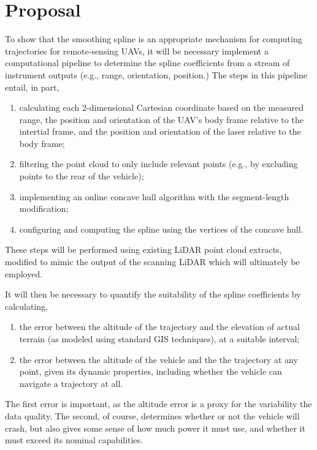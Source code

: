 \documentclass[doc]{apa6}
\begin{document}
\section{Proposal}

To show that the smoothing spline is an appropriate mechanism for computing trajectories for remote-sensing UAVs, it will be necessary implement a computational pipeline to determine the spline coefficients from a stream of instrument outputs (e.g.,  range, orientation, position.) The steps in this pipeline entail, in part,

\begin{enumerate}
\item calculating each 2-dimensional Cartesian coordinate based on the measured range, the position and  orientation of the UAV's body frame relative to the intertial frame, and the position and orientation of the laser relative to the body frame;
\item filtering the point cloud to only include relevant points (e.g., by excluding points to the rear of the vehicle);
\item implementing an online concave hull algorithm with the segment-length modification;
\item configuring and computing the spline using the vertices of the concave hull.
\end{enumerate}

These steps will be performed using existing LiDAR point cloud extracts, modified to mimic the output of the scanning LiDAR which will ultimately be employed.

It will then be necessary to quantify the suitability of the spline coefficients by calculating,

\begin{enumerate}
\item the error between the altitude of the trajectory and the elevation of actual terrain (as modeled using standard GIS techniques), at a suitable interval;
\item the error between the altitude of the vehicle and the the trajectory at any point, given its dynamic properties, including whether the vehicle can navigate a trajectory at all.
\end{enumerate}

The first error is important, as the altitude error is a proxy for the variability the data quality. The second, of course, determines whether or not the vehicle will crash, but also gives some sense of how much power it must use, and whether it must exceed its nominal capabilities.
\end{document}
